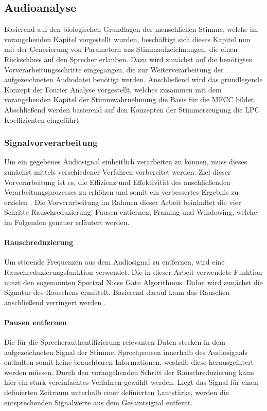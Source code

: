 \subsection{Audioanalyse}
Basierend auf den biologischen Grundlagen der menschlichen Stimme, welche im vorangehenden Kapitel vorgestellt wurden, beschäftigt sich dieses Kapitel nun mit der Generierung von Parametern aus Stimmaufzeichnungen, die einen Rückschluss auf den Sprecher erlauben.
Dazu wird zunächst auf die benötigten Vorverarbeitungsschritte eingegangen, die zur Weiterverarbeitung der aufgezeichneten Audiodatei benötigt werden.
Anschließend wird das grundlegende Konzept der Fourier Analyse vorgestellt, welches zusammen mit dem vorangehenden Kapitel der Stimmwahrnehmung die Basis für die \ac{MFCC} bildet.
Abschließend werden basierend auf den Konzepten der Stimmerzeugung die \ac{LPC} Koeffizienten eingeführt.

\subsubsection{Signalvorverarbeitung}\label{sec:preprocessing}
Um ein gegebenes Audiosignal einheitlich verarbeiten zu können, muss dieses zunächst mittels verschiedener Verfahren vorbereitet werden.
Ziel dieser Vorverarbeitung ist es, die Effizienz und Effektivität des anschließenden Verarbeitungsprozesses zu erhöhen und somit ein verbessertes Ergebnis zu erzielen \autocite[vgl.][S. 11672]{lokesh_speech_2019}.
Die Vorverarbeitung im Rahmen dieser Arbeit beinhaltet die vier Schritte Rauschreduzierung, Pausen entfernen, Framing und Windowing, welche im Folgenden genauer erläutert werden.

\paragraph{Rauschreduzierung}\label{sec:Rauschreduzierung}
Um störende Frequenzen aus dem Audiosignal zu entfernen, wird eine Rauschreduzierungsfunktion verwendet.
Die in dieser Arbeit verwendete Funktion nutzt den sogenannten Spectral Noise Gate Algorithmus.
Dabei wird zunächst die Signatur des Rauschens ermittelt.
Basierend darauf kann das Rauschen anschließend verringert werden \autocite[vgl.][S. 25]{kiapuchinski_spectral_2012}.

\paragraph{Pausen entfernen}
Die für die Sprecherauthentifizierung relevanten Daten stecken in dem aufgezeichneten Signal der Stimme.
Sprechpausen innerhalb des Audiosignals enthalten somit keine brauchbaren Informationen, weshalb diese herausgefiltert werden müssen.
Durch den vorangehenden Schritt der Rauschreduzierung kann hier ein stark vereinfachtes Verfahren gewählt werden.
Liegt das Signal für einen definierten Zeitraum unterhalb einer definierten Lautstärke, werden die entsprechenden Signalwerte aus dem Gesamtsignal entfernt.

